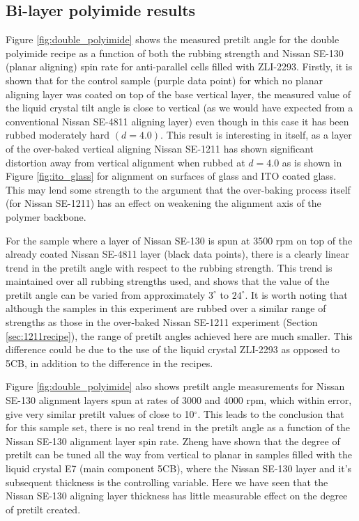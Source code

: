 \subsection{Bi-layer polyimide results}
Figure \ref{fig:double_polyimide} shows the measured pretilt angle for the double polyimide recipe as a function of both the rubbing strength and Nissan SE-130 (planar aligning) spin rate for anti-parallel cells filled with ZLI-2293. Firstly, it is shown that for the control sample (purple data point) for which no planar aligning layer was coated on top of the base vertical layer, the measured value of the liquid crystal tilt angle is close to vertical (as we would have expected from a conventional Nissan SE-4811 aligning layer) even though in this case it has been rubbed moderately hard $\left(d=4.0\right)$. This result is interesting in itself, as a layer of the over-baked vertical aligning Nissan SE-1211 has shown significant distortion away from vertical alignment when rubbed at $d=4.0$ as is shown in Figure \ref{fig:ito_glass} for alignment on surfaces of glass and ITO coated glass. This may lend some strength to the argument that the over-baking process itself (for Nissan SE-1211) has an effect on weakening the alignment axis of the polymer backbone. 

For the sample where a layer of Nissan SE-130 is spun at 3500 rpm on top of the already coated Nissan SE-4811 layer (black data points), there is a clearly linear trend in the pretilt angle with respect to the rubbing strength. This trend is maintained over all rubbing strengths used, and shows that the value of the pretilt angle can be varied from approximately $3^{\circ}$ to $24^{\circ}$. It is worth noting that although the samples in this experiment are rubbed over a similar range of strengths as those in the over-baked Nissan SE-1211 experiment (Section \ref{sec:1211recipe}), the range of pretilt angles achieved here are much smaller. This difference could be due to the use of the liquid crystal ZLI-2293 as opposed to 5CB, in addition to the difference in the recipes. 

Figure \ref{fig:double_polyimide} also shows pretilt angle measurements for Nissan SE-130 alignment layers spun at rates of 3000 and 4000 rpm, which within error, give very similar pretilt values of close to 10$^{\circ}$. This leads to the conclusion that for this sample set, there is no real trend in the pretilt angle as a function of the Nissan SE-130 alignment layer spin rate. Zheng  \cite{Zheng2007} have shown that the degree of pretilt can be tuned all the way from vertical to planar in samples filled with the liquid crystal E7 (main component 5CB), where the Nissan SE-130 layer and it's subsequent thickness is the controlling variable. Here we have seen that the Nissan SE-130 aligning layer thickness has little measurable effect on the degree of pretilt created.

